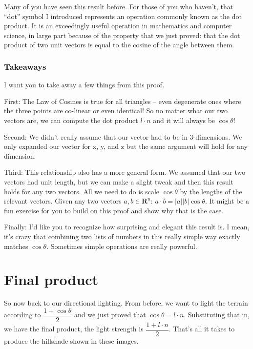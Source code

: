 \documentclass{article}
\begin{document}
Many of you have seen this result before.
For those of you who haven't, that ``dot'' symbol I introduced represents an operation commonly known as the dot product.
It is an exceedingly useful operation in mathematics and computer science, in large part because of the property that we just proved: that the dot product of two unit vectors is equal to the cosine of the angle between them.

\subsubsection{Takeaways}

I want you to take away a few things from this proof.

First: The Law of Cosines is true for all triangles -- even degenerate ones where the three points are co-linear or even identical!
So no matter what our two vectors are, we can compute the dot product $l \cdot n$ and it will always be $\cos \theta$!

Second: We didn't really assume that our vector had to be in 3-dimensions.
We only expanded our vector for x, y, and z but the same argument will hold for any dimension.

Third: This relationship also has a more general form.
We assumed that our two vectors had unit length, but we can make a slight tweak and then this result holds for any two vectors.
All we need to do is scale $\cos \theta$ by the lengths of the relevant vectors.
Given any two vectors $ a, b \in \mathbf{R}^n$: $a \cdot b = |a| |b| \cos \theta$.
It might be a fun exercise for you to build on this proof and show why that is the case.

Finally: I'd like you to recognize how surprising and elegant this result is.
I mean, it's crazy that combining two lists of numbers in this really simple way exactly matches $\cos \theta$.
Sometimes simple operations are really powerful.

\section{Final product}

So now back to our directional lighting.
From before, we want to light the terrain according to $\dfrac{1 + \cos \theta}{2}$ and we just proved that $\cos \theta = l \cdot n$.
Substituting that in, we have the final product, the light strength is $\dfrac{1 + l \cdot n}{2}$.
That's all it takes to produce the hillshade shown in these images.
\end{document}
